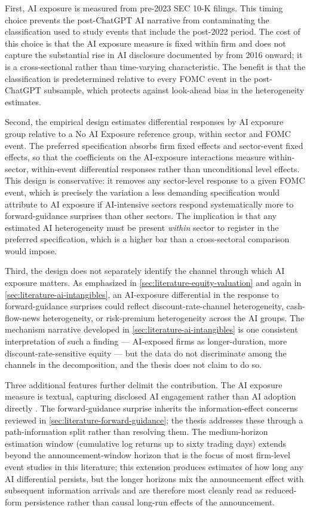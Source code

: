 First, AI exposure is measured from pre-2023 SEC 10-K filings. This
timing choice prevents the post-ChatGPT AI narrative from contaminating
the classification used to study events that include the post-2022
period. The cost of this choice is that the AI exposure measure is
fixed within firm and does not capture the substantial rise in AI
disclosure documented by \citet{anteSaggu2025} from 2016 onward; it is
a cross-sectional rather than time-varying characteristic. The
benefit is that the classification is predetermined relative to every
FOMC event in the post-ChatGPT subsample, which protects against
look-ahead bias in the heterogeneity estimates.

Second, the empirical design estimates differential responses by AI
exposure group relative to a No AI Exposure reference group, within
sector and FOMC event. The preferred specification absorbs firm
fixed effects and sector-event fixed effects, so that the coefficients
on the AI-exposure interactions measure within-sector, within-event
differential responses rather than unconditional level effects. This
design is conservative: it removes any sector-level response to a
given FOMC event, which is precisely the variation a less demanding
specification would attribute to AI exposure if AI-intensive sectors
respond systematically more to forward-guidance surprises than other
sectors. The implication is that any estimated AI heterogeneity must
be present \emph{within} sector to register in the preferred
specification, which is a higher bar than a cross-sectoral comparison
would impose.

Third, the design does not separately identify the channel through
which AI exposure matters. As emphasized in
\cref{sec:literature-equity-valuation} and again in
\cref{sec:literature-ai-intangibles}, an AI-exposure differential in
the response to forward-guidance surprises could reflect discount-rate-channel
heterogeneity, cash-flow-news heterogeneity, or risk-premium heterogeneity
across the AI groups. The mechanism narrative developed in
\cref{sec:literature-ai-intangibles} is one consistent interpretation
of such a finding --- AI-exposed firms as longer-duration, more
discount-rate-sensitive equity --- but the data do not discriminate
among the channels in the \citet{campbellAmmer1993} decomposition,
and the thesis does not claim to do so.

Three additional features further delimit the contribution. The AI
exposure measure is textual, capturing disclosed AI engagement rather
than AI adoption directly \citep{anteSaggu2025}. The forward-guidance
surprise inherits the information-effect concerns reviewed in
\cref{sec:literature-forward-guidance}; the thesis addresses these
through a path-information split rather than resolving them. The
medium-horizon estimation window (cumulative log returns up to sixty
trading days) extends beyond the announcement-window horizon that is
the focus of most firm-level event studies in this literature; this
extension produces estimates of how long any AI differential persists,
but the longer horizons mix the announcement effect with subsequent
information arrivals and are therefore most cleanly read as
reduced-form persistence rather than causal long-run effects of the
announcement.

